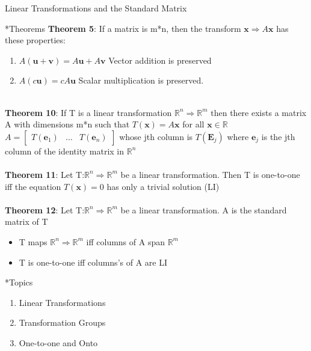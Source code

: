 \documentclass[a4paper, 12pt]{article}
\begin{document}
\begin{section}{Linear Transformations and the Standard Matrix}
\begin{subsection}*{Theorems}
\textbf{Theorem 5}: If a matrix is m*n, then the transform 
$\textbf{x} \Rightarrow A\textbf{x}$ has these properties:
\begin{enumerate}
\item{$A(\textbf{u}+\textbf{v})=A\textbf{u}+A\textbf{v}$
Vector addition is preserved}
\item{$A(c\textbf{u})=cA\textbf{u}$} Scalar multiplication
	is preserved.
\end{enumerate}
\\
\textbf{Theorem 10}: If T is a linear transformation
$\mathbb{R}^n \Rightarrow \mathbb{R}^m$ then there exists a matrix
A with dimensions m*n such that $T(\textbf{x})=A\textbf{x}$ for
all $\textbf{x}\in\mathbb{R}$ 
\\
$A= \begin{bmatrix} T(\textbf{e}_1) & \dots & T(\textbf{e}_n) 
\end{bmatrix}$ whose jth column is $T(\textbf{E}_j)$ where 
$\textbf{e}_j$ is the jth column of the identity matrix in 
$\mathbb{R}^n$
\\
\\ \textbf{Theorem 11}: Let T:$\mathbb{R}^n\Rightarrow\mathbb{R}^m$
be a linear transformation. Then T is one-to-one iff the equation $T(\textbf{x})=0$ has only
a trivial solution (LI)
\\
\\ \textbf{Theorem 12}:
Let T:$\mathbb{R}^n\Rightarrow\mathbb{R}^m$
be a linear transformation. A is the standard matrix of T
\begin{itemize}
\item{T maps $\mathbb{R}^n\Rightarrow\mathbb{R}^m$ iff columns of
	A span $\mathbb{R}^m$}
\item{T is one-to-one iff columns's of A are LI}
\end{itemize}
\end{subsection}
	
\begin{subsection}*{Topics}
\begin{enumerate}
\item{Linear Transformations}
\item{Transformation Groups}
\item{One-to-one and Onto}
\end{enumerate}
\end{subsection}


\end{section}
\end{document}
